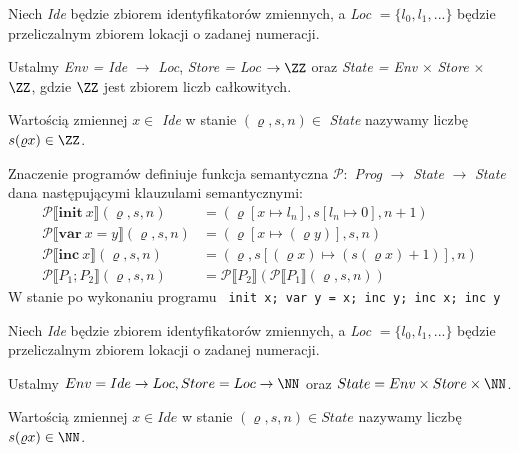 \begin{problems}
    \prob Niech \textit{Ide} będzie zbiorem identyfikatorów zmiennych, a \textit{Loc} $= \{l_0, l_1, ...\}$ będzie przeliczalnym zbiorem lokacji o zadanej numeracji.
    
    Ustalmy \textit{Env = Ide} $\rightarrow$ \textit{Loc}, \textit{Store = Loc} $\rightarrow \ZZ$ oraz \textit{State = Env} $\times$ \textit{Store} $\times$ $\ZZ$, gdzie $\ZZ$ jest zbiorem liczb całkowitych.
    
    Wartością zmiennej $x \in $ \textit{Ide} w stanie $(\varrho, s, n) \in $ \textit{State} nazywamy liczbę $s(\varrho x) \in \ZZ$.
    
    Znaczenie programów definiuje funkcja semantyczna $\mathcal{P}:$ \textit{Prog} $\rightarrow$ \textit{State} $\rightarrow$ \textit{State} dana następującymi klauzulami semantycznymi:
    \begin{align*}
        \mathcal{P} \llbracket \textbf{init} \ x \rrbracket (\varrho, s, n) &= (\varrho[x \mapsto l_n], s[l_n \mapsto 0], n + 1) \\
        \mathcal{P} \llbracket \textbf{var} \ x = y \rrbracket (\varrho, s, n) &= (\varrho[x \mapsto (\varrho y)], s, n) \\
        \mathcal{P} \llbracket \textbf{inc} \ x \rrbracket (\varrho, s, n) &= (\varrho, s[(\varrho x) \mapsto (s(\varrho x) + 1)], n) \\
        \mathcal{P} \llbracket P_1; P_2 \rrbracket (\varrho, s, n) &= \mathcal{P} \llbracket P_2 \rrbracket(\mathcal{P} \llbracket P_1 \rrbracket(\varrho, s, n))
    \end{align*}
    W stanie po wykonaniu programu \texttt{
        init x;
        var y = x;
        inc y;
        inc x;
        inc y
    }

    \prob Niech \textit{Ide} będzie zbiorem identyfikatorów zmiennych, a \textit{Loc} $= \{l_0, l_1, ...\}$ będzie przeliczalnym zbiorem lokacji o zadanej numeracji.
    
    Ustalmy $Env = Ide \to Loc, Store = Loc \to \NN$ oraz $State = Env \times Store \times \NN$.
    
    Wartością zmiennej $x \in Ide$ w stanie $(\varrho, s, n) \in State$ nazywamy liczbę $s(\varrho x) \in \NN$.
    

\end{problems}
